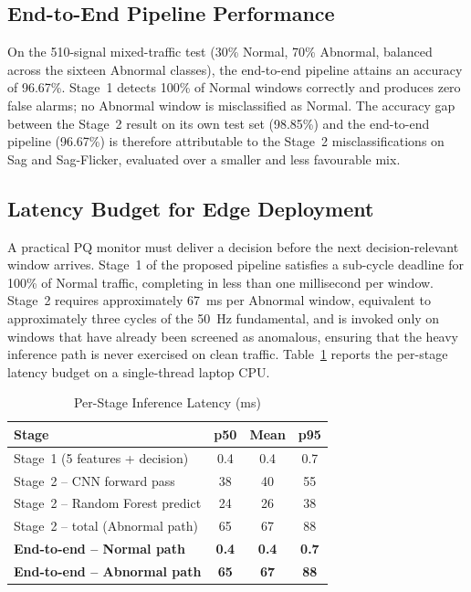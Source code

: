 \documentclass[conference]{IEEEtran}
\begin{document}
\subsection{End-to-End Pipeline Performance}
On the 510-signal mixed-traffic test (30\% Normal, 70\% Abnormal,
balanced across the sixteen Abnormal classes), the end-to-end
pipeline attains an accuracy of 96.67\%. Stage~1 detects 100\% of
Normal windows correctly and produces zero false alarms; no Abnormal
window is misclassified as Normal. The accuracy gap between the
Stage~2 result on its own test set (98.85\%) and the end-to-end
pipeline (96.67\%) is therefore attributable to the Stage~2
misclassifications on Sag and Sag-Flicker, evaluated over a smaller
and less favourable mix.

\subsection{Latency Budget for Edge Deployment}\label{sec:cnnvsrf}
A practical PQ monitor must deliver a decision before the next
decision-relevant window arrives. Stage~1 of the proposed pipeline
satisfies a sub-cycle deadline for 100\% of Normal traffic, completing
in less than one millisecond per window. Stage~2 requires
approximately 67~ms per Abnormal window, equivalent to approximately
three cycles of the 50~Hz fundamental, and is invoked only on windows
that have already been screened as anomalous, ensuring that the heavy
inference path is never exercised on clean traffic.
Table~\ref{tab:latency} reports the per-stage latency budget on a
single-thread laptop CPU.

\begin{table}[!htbp]
  \centering
  \caption{Per-Stage Inference Latency (ms)}
  \label{tab:latency}
  \footnotesize
  \setlength{\tabcolsep}{4pt}
  \renewcommand{\arraystretch}{1.2}
  \begin{tabular}{|l|c|c|c|}
    \hline
    Stage & p50 & Mean & p95 \\
    \hline
    Stage~1 (5 features + decision)        & 0.4  & 0.4  & 0.7  \\
    \hline
    Stage~2 -- CNN forward pass            & 38   & 40   & 55   \\
    \hline
    Stage~2 -- Random Forest predict       & 24   & 26   & 38   \\
    \hline
    Stage~2 -- total (Abnormal path)       & 65   & 67   & 88   \\
    \hline
    \textbf{End-to-end -- Normal path}     & \textbf{0.4} & \textbf{0.4} & \textbf{0.7} \\
    \hline
    \textbf{End-to-end -- Abnormal path}   & \textbf{65}  & \textbf{67}  & \textbf{88}  \\
    \hline
  \end{tabular}
\end{table}
\end{document}
